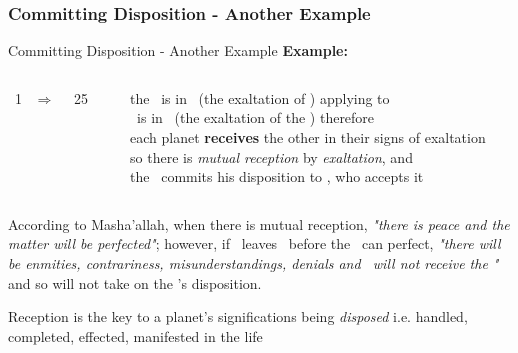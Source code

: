\subsubsection{Committing Disposition - Another Example}
\begin{frame}[t]{Committing Disposition - Another Example}
\textbf{Example:}\footnotemark[1]
\begin{columns}[T, onlytextwidth]
\Sun\ 1 \Libra\ $\Rightarrow$ \Opposition\ \Saturn\ 25 \Aries

\rule{.1mm}{.20\textheight}

the \Sun\ is in \Libra\ (the exaltation of \Saturn) applying to \Opposition\ \Saturn \\
\Saturn\ is in \Aries\ (the exaltation of the \Sun) therefore \\
each planet \textbf{receives} the other in their signs of exaltation \\
so there is \textsl{mutual reception} by \textsl{exaltation}, and \\
the \Sun\ commits his disposition to \Saturn, who accepts it
\end{columns}
\vspace{0.25cm}
According to Masha'allah, when there is mutual reception, \textsl{"there is peace and the matter will be perfected"}; however, if \Saturn\ leaves \Aries\ before the \Opposition\ can perfect, \textsl{"there will be enmities, contrariness, misunderstandings, denials and \Saturn\ will not receive the \Sun"} and so will not take on the \Sun's disposition.

\begin{block}{}
Reception is the key to a planet's significations being \textsl{disposed} i.e. handled, completed, effected, manifested in the life
\end{block}

\end{frame}
